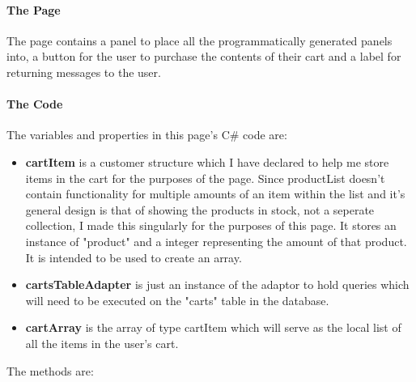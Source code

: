 ﻿\documentclass{article}
\begin{document}
    \paragraph{The Page}
    The page contains a panel to place all the programmatically generated panels into, a button for the user to purchase the contents of their cart and a label for returning messages to the user.
    \paragraph{The Code}
    The variables and properties in this page's C\# code are:
    \begin{itemize}
        \item \textbf{cartItem} is a customer structure which I have declared to help me store items in the cart for the purposes of the page.
        Since productList doesn't contain functionality for multiple amounts of an item within the list and it's general design is that of showing the products in stock, not a seperate collection, I made this singularly for the purposes of this page.
        It stores an instance of "product" and a integer representing the amount of that product.
        It is intended to be used to create an array.
        \item \textbf{cartsTableAdapter} is just an instance of the adaptor to hold queries which will need to be executed on the "carts" table in the database.
        \item \textbf{cartArray} is the array of type cartItem which will serve as the local list of all the items in the user's cart.
    \end{itemize}
    The methods are:
\end{document}
